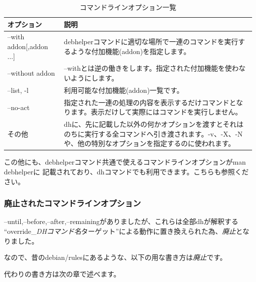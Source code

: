 \documentclass[mingoth,a4paper]{jsarticle}
\begin{document}
\begin{table}[ht]
\begin{center}
\small
\begin{tabular}{|p{10em}|p{33em}|}
\hline
オプション&説明 \\
\hline
--with addon[,addon ...] & debhelperコマンドに適切な場所で一連のコマンドを実行するような付加機能(addon)を指定します。\\
\hline
--without addon　& --withとは逆の働きをします。指定された付加機能を使わないようにします。\\
\hline
--list, -l & 利用可能な付加機能(addon)一覧です。\\
\hline
--no-act & 指定された一連の処理の内容を表示するだけコマンドとなります。表示だけして実際にはコマンドを実行しません。\\
\hline
その他 & dhに、先に記載した以外の何かオプションを渡すとそれはのちに実行する全コマンドへ引き渡されます。-v、-X、-Nや、他の特別なオプションを指定するのに使われます。\\
\hline
\end{tabular}
\caption{コマンドラインオプション一覧}
\label{tab:sequence-dh-opts}
\end{center}
\end{table}

この他にも、debhelperコマンド共通で使えるコマンドラインオプションがman debhelperに
記載されており、dhコマンドでも利用できます。こちらも参照ください。

\subsubsection{廃止されたコマンドラインオプション}

--until,--before,--after,--remainingがありましたが、これらは全部dhが解釈する
``override\_{\em DHコマンド名}ターゲット''による動作に置き換えられた為、{\em 廃止}となりました。

なので、昔のdebian/rulesにあるような、以下の用な書き方は{\em 廃止}です。


代わりの書き方は次の章で述べます。
\end{document}
